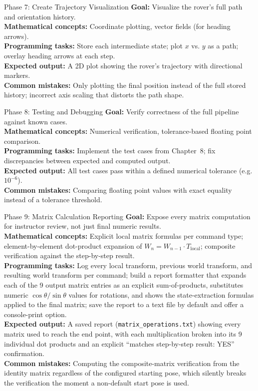 \documentclass[12pt]{report}
\begin{document}
\begin{phasebox}{Phase 7: Create Trajectory Visualization}
\textbf{Goal:} Visualize the rover's full path and orientation history. \\
\textbf{Mathematical concepts:} Coordinate plotting, vector fields (for heading arrows). \\
\textbf{Programming tasks:} Store each intermediate state; plot $x$ vs. $y$ as a path; overlay heading arrows at each step. \\
\textbf{Expected output:} A 2D plot showing the rover's trajectory with directional markers. \\
\textbf{Common mistakes:} Only plotting the final position instead of the full stored history; incorrect axis scaling that distorts the path shape.
\end{phasebox}

\begin{phasebox}{Phase 8: Testing and Debugging}
\textbf{Goal:} Verify correctness of the full pipeline against known cases. \\
\textbf{Mathematical concepts:} Numerical verification, tolerance-based floating point comparison. \\
\textbf{Programming tasks:} Implement the test cases from Chapter~8; fix discrepancies between expected and computed output. \\
\textbf{Expected output:} All test cases pass within a defined numerical tolerance (e.g. $10^{-6}$). \\
\textbf{Common mistakes:} Comparing floating point values with exact equality instead of a tolerance threshold.
\end{phasebox}

\begin{phasebox}{Phase 9: Matrix Calculation Reporting}
\textbf{Goal:} Expose every matrix computation for instructor review, not just final numeric results. \\
\textbf{Mathematical concepts:} Explicit local matrix formulas per command type; element-by-element dot-product expansion of $W_n = W_{n-1} \cdot T_{\text{local}}$; composite verification against the step-by-step result. \\
\textbf{Programming tasks:} Log every local transform, previous world transform, and resulting world transform per command; build a report formatter that expands each of the 9 output matrix entries as an explicit sum-of-products, substitutes numeric $\cos\theta/\sin\theta$ values for rotations, and shows the state-extraction formulas applied to the final matrix; save the report to a text file by default and offer a console-print option. \\
\textbf{Expected output:} A saved report (\texttt{matrix\_operations.txt}) showing every matrix used to reach the end point, with each multiplication broken into its 9 individual dot products and an explicit ``matches step-by-step result: YES'' confirmation. \\
\textbf{Common mistakes:} Computing the composite-matrix verification from the identity matrix regardless of the configured starting pose, which silently breaks the verification the moment a non-default start pose is used.
\end{phasebox}
\end{document}
